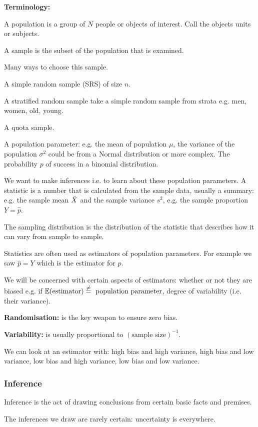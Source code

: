\documentclass[10pt, a4paper]{article}
\begin{document}
\textbf{Terminology:}

A population is a group of $N$ people or objects of interest.
Call the objects units or subjects.

A sample is the subset of the population that is examined.

Many ways to choose this sample.

A simple random sample
(SRS)
of size $n$.

A stratified random sample take a simple random sample from strata e.g. men,
women,
old,
young.

A quota sample.

A population parameter:
e.g. the mean of population $\mu$,
the variance of the population $\sigma ^ 2$
could be from a Normal distribution or more complex.
The probability $p$ of success in a binomial distribution.

We want to make inferences i.e. to learn about these population parameters.
A statistic is a number that is calculated from the sample data,
usually a summary:
e.g. the sample mean $\Bar{X}$ and the sample variance $s ^ 2$,
e.g. the sample proportion $Y = \hat{p}$.

The sampling distribution is the distribution of the statistic that describes how it can vary from sample to sample.

Statistics are often used as estimators of population parameters.
For example we saw $\hat{p} = Y$ which is the estimator for $p$.

We will be concerned with certain aspects of estimators:
whether or not they are biased e.g. if $\mathbb{E}(\text{estimator}) \overset{\neq}{=} \text{ population parameter}$,
degree of variability
(i.e. their variance).

\textbf{Randomisation:}
is the key weapon to ensure zero bias.

\textbf{Variability:}
is usually proportional to $(\text{sample size}) ^ {-1}$.

We can look at an estimator with:
high bias and high variance,
high bias and low variance,
low bias and high variance,
low bias and low variance.

\subsubsection{Inference}
Inference is the act of drawing conclusions from certain basic facts and premises.

The inferences we draw are rarely certain:
uncertainty is everywhere.
\end{document}
